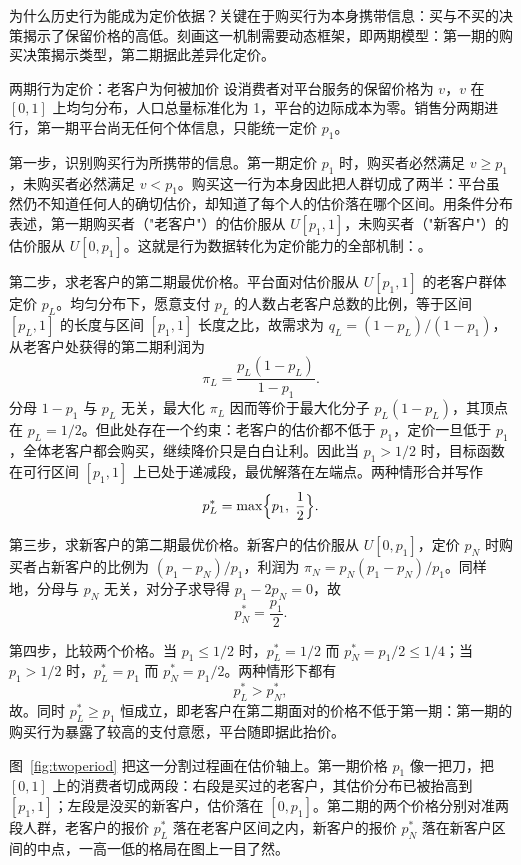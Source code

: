 为什么历史行为能成为定价依据？关键在于购买行为本身携带信息：买与不买的决策揭示了保留价格的高低。刻画这一机制需要动态框架，即两期模型：第一期的购买决策揭示类型，第二期据此差异化定价。

\begin{derivation}{两期行为定价：老客户为何被加价}{}
设消费者对平台服务的保留价格为 $v$，$v$ 在 $[0,1]$ 上均匀分布，人口总量标准化为 1，平台的边际成本为零。销售分两期进行，第一期平台尚无任何个体信息，只能统一定价 $p_1$。

第一步，识别购买行为所携带的信息。第一期定价 $p_1$ 时，购买者必然满足 $v \geq p_1$，未购买者必然满足 $v < p_1$。购买这一行为本身因此把人群切成了两半：平台虽然仍不知道任何人的确切估价，却知道了每个人的估价落在哪个区间。用条件分布表述，第一期购买者（"老客户"）的估价服从 $U[p_1, 1]$，未购买者（"新客户"）的估价服从 $U[0, p_1]$。这就是行为数据转化为定价能力的全部机制：。

第二步，求老客户的第二期最优价格。平台面对估价服从 $U[p_1,1]$ 的老客户群体定价 $p_L$。均匀分布下，愿意支付 $p_L$ 的人数占老客户总数的比例，等于区间 $[p_L,1]$ 的长度与区间 $[p_1,1]$ 长度之比，故需求为 $q_L = (1-p_L)/(1-p_1)$，从老客户处获得的第二期利润为
\[
\pi_L = \frac{p_L(1 - p_L)}{1-p_1}.
\]
分母 $1-p_1$ 与 $p_L$ 无关，最大化 $\pi_L$ 因而等价于最大化分子 $p_L(1-p_L)$，其顶点在 $p_L = 1/2$。但此处存在一个约束：老客户的估价都不低于 $p_1$，定价一旦低于 $p_1$，全体老客户都会购买，继续降价只是白白让利。因此当 $p_1 > 1/2$ 时，目标函数在可行区间 $[p_1,1]$ 上已处于递减段，最优解落在左端点。两种情形合并写作
\[
p_L^* = \max\Bigl\{p_1,\; \frac{1}{2}\Bigr\}.
\]

第三步，求新客户的第二期最优价格。新客户的估价服从 $U[0,p_1]$，定价 $p_N$ 时购买者占新客户的比例为 $(p_1 - p_N)/p_1$，利润为 $\pi_N = p_N(p_1-p_N)/p_1$。同样地，分母与 $p_N$ 无关，对分子求导得 $p_1 - 2p_N = 0$，故
\[
p_N^* = \frac{p_1}{2}.
\]

第四步，比较两个价格。当 $p_1 \leq 1/2$ 时，$p_L^* = 1/2$ 而 $p_N^* = p_1/2 \leq 1/4$；当 $p_1 > 1/2$ 时，$p_L^* = p_1$ 而 $p_N^* = p_1/2$。两种情形下都有
\[
p_L^* > p_N^*,
\]
故。同时 $p_L^* \geq p_1$ 恒成立，即老客户在第二期面对的价格不低于第一期：第一期的购买行为暴露了较高的支付意愿，平台随即据此抬价。
\end{derivation}

图~\ref{fig:twoperiod} 把这一分割过程画在估价轴上。第一期价格 $p_1$ 像一把刀，把 $[0,1]$ 上的消费者切成两段：右段是买过的老客户，其估价分布已被抬高到 $[p_1,1]$；左段是没买的新客户，估价落在 $[0,p_1]$。第二期的两个价格分别对准两段人群，老客户的报价 $p_L^*$ 落在老客户区间之内，新客户的报价 $p_N^*$ 落在新客户区间的中点，一高一低的格局在图上一目了然。

